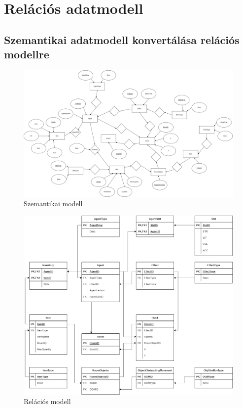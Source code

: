 \section{Relációs adatmodell}


\subsection{Szemantikai adatmodell konvertálása relációs modellre}


\begin{figure}[!ht]
	\centering
	\includegraphics[scale=0.25]{images/szemantikaimodel4.drawio.png}
	\caption{Szemantikai modell}
	\label{fig:Szemantikai modell}
\end{figure}

\begin{figure}[!ht]
	\centering
	\includegraphics[scale=0.35]{images/relaciosadatmodel4.drawio.png}
	\caption{Relációs modell}
	\label{fig:Relációs modell}
\end{figure}

